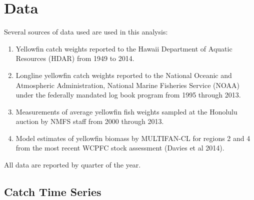 \documentclass[12pt,letterpaper]{article}
\begin{document}
\section*{Data}
Several sources of data used are used in this analysis:
\begin{enumerate}
\item  Yellowfin catch weights reported to the Hawaii Department of Aquatic
Resources (HDAR) from 1949 to 2014.
\item Longline yellowfin catch weights reported to the National Oceanic and
Atmospheric Administration, National Marine Fisheries Service (NOAA)
under the federally mandated log book program from 1995 through 2013.
\item Measurements of average yellowfin fish weights sampled at the
Honolulu auction by NMFS staff from 2000 through 2013.
\item Model estimates of yellowfin biomass by MULTIFAN-CL for regions
2 and 4 from the most recent WCPFC stock assessment (Davies et al 2014).
\end{enumerate}
All data are reported by quarter of the year.

\subsection*{Catch Time Series}


\end{document}
